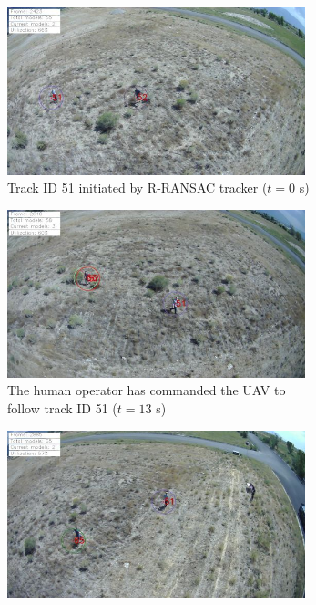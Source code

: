 \begin{figure}[htbp]
	\begin{subfigure}{0.48\linewidth}
		\centering
		\includegraphics[width=0.95\textwidth]{images/chapter3/ID51_track_begin.png}
		\caption{Track ID 51 initiated by R-RANSAC tracker ($t=0$ s)}
		\label{camera1}
	\end{subfigure}
	\begin{subfigure}{0.48\linewidth}
		\centering
		\includegraphics[width=0.95\textwidth]{images/chapter3/ID51_follow_begin.png}
		\caption{The human operator has commanded the UAV to follow track ID 51 ($t=13$ s)}
		\label{camera2}
	\end{subfigure}
	\begin{subfigure}{0.48\linewidth}
		\centering
		\includegraphics[width=0.95\textwidth]{images/chapter3/ID65_track_begin.png}

\end{subfigure}
\end{figure}
